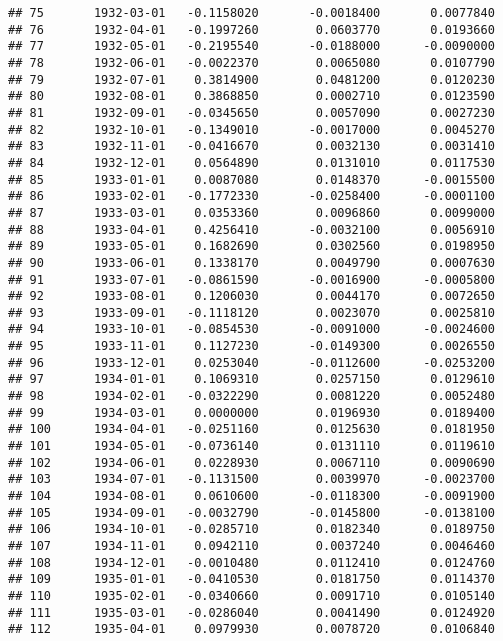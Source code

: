 \documentclass[
]{article}
\begin{document}
\begin{verbatim}
## 75       1932-03-01   -0.1158020       -0.0018400       0.0077840
## 76       1932-04-01   -0.1997260        0.0603770       0.0193660
## 77       1932-05-01   -0.2195540       -0.0188000      -0.0090000
## 78       1932-06-01   -0.0022370        0.0065080       0.0107790
## 79       1932-07-01    0.3814900        0.0481200       0.0120230
## 80       1932-08-01    0.3868850        0.0002710       0.0123590
## 81       1932-09-01   -0.0345650        0.0057090       0.0027230
## 82       1932-10-01   -0.1349010       -0.0017000       0.0045270
## 83       1932-11-01   -0.0416670        0.0032130       0.0031410
## 84       1932-12-01    0.0564890        0.0131010       0.0117530
## 85       1933-01-01    0.0087080        0.0148370      -0.0015500
## 86       1933-02-01   -0.1772330       -0.0258400      -0.0001100
## 87       1933-03-01    0.0353360        0.0096860       0.0099000
## 88       1933-04-01    0.4256410       -0.0032100       0.0056910
## 89       1933-05-01    0.1682690        0.0302560       0.0198950
## 90       1933-06-01    0.1338170        0.0049790       0.0007630
## 91       1933-07-01   -0.0861590       -0.0016900      -0.0005800
## 92       1933-08-01    0.1206030        0.0044170       0.0072650
## 93       1933-09-01   -0.1118120        0.0023070       0.0025810
## 94       1933-10-01   -0.0854530       -0.0091000      -0.0024600
## 95       1933-11-01    0.1127230       -0.0149300       0.0026550
## 96       1933-12-01    0.0253040       -0.0112600      -0.0253200
## 97       1934-01-01    0.1069310        0.0257150       0.0129610
## 98       1934-02-01   -0.0322290        0.0081220       0.0052480
## 99       1934-03-01    0.0000000        0.0196930       0.0189400
## 100      1934-04-01   -0.0251160        0.0125630       0.0181950
## 101      1934-05-01   -0.0736140        0.0131110       0.0119610
## 102      1934-06-01    0.0228930        0.0067110       0.0090690
## 103      1934-07-01   -0.1131500        0.0039970      -0.0023700
## 104      1934-08-01    0.0610600       -0.0118300      -0.0091900
## 105      1934-09-01   -0.0032790       -0.0145800      -0.0138100
## 106      1934-10-01   -0.0285710        0.0182340       0.0189750
## 107      1934-11-01    0.0942110        0.0037240       0.0046460
## 108      1934-12-01   -0.0010480        0.0112410       0.0124760
## 109      1935-01-01   -0.0410530        0.0181750       0.0114370
## 110      1935-02-01   -0.0340660        0.0091710       0.0105140
## 111      1935-03-01   -0.0286040        0.0041490       0.0124920
## 112      1935-04-01    0.0979930        0.0078720       0.0106840

\end{verbatim}
\end{document}
